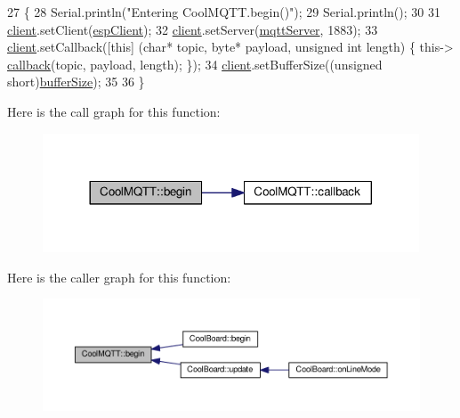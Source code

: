 \begin{DoxyCode}
27 \{ 
28     Serial.println(\textcolor{stringliteral}{"Entering CoolMQTT.begin()"});
29     Serial.println();
30 
31     \hyperlink{classCoolMQTT_a4ca71e4f76ef868692a297efd45b1415}{client}.setClient(\hyperlink{classCoolMQTT_acc30a0200967374a524092a8a806502a}{espClient});
32     \hyperlink{classCoolMQTT_a4ca71e4f76ef868692a297efd45b1415}{client}.setServer(\hyperlink{classCoolMQTT_ab8bb951f87ddbf92db74c2ad16a3e53e}{mqttServer}, 1883); 
33     \hyperlink{classCoolMQTT_a4ca71e4f76ef868692a297efd45b1415}{client}.setCallback([\textcolor{keyword}{this}] (\textcolor{keywordtype}{char}* topic, byte* payload, \textcolor{keywordtype}{unsigned} \textcolor{keywordtype}{int} length) \{ this->
      \hyperlink{classCoolMQTT_a30d82ad665bfb603f46ecdbc290775df}{callback}(topic, payload, length); \});
34     \hyperlink{classCoolMQTT_a4ca71e4f76ef868692a297efd45b1415}{client}.setBufferSize((\textcolor{keywordtype}{unsigned} \textcolor{keywordtype}{short})\hyperlink{classCoolMQTT_a7f3cf26b51d6770f216e42c5ef13ca9f}{bufferSize});
35 
36 \}
\end{DoxyCode}
Here is the call graph for this function\+:\nopagebreak
\begin{figure}[H]
\begin{center}
\leavevmode
\includegraphics[width=317pt]{classCoolMQTT_ac9248808641ebf3054ed0620ea9d0100_cgraph}
\end{center}
\end{figure}
Here is the caller graph for this function\+:\nopagebreak
\begin{figure}[H]
\begin{center}
\leavevmode
\includegraphics[width=350pt]{classCoolMQTT_ac9248808641ebf3054ed0620ea9d0100_icgraph}
\end{center}
\end{figure}
\mbox{\label{classCoolMQTT_a30d82ad665bfb603f46ecdbc290775df}} 
